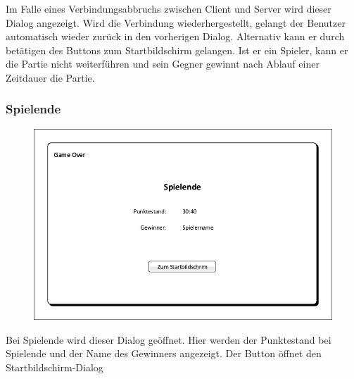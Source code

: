 Im Falle eines Verbindungsabbruchs zwischen Client und Server wird dieser Dialog angezeigt. Wird die Verbindung wiederhergestellt, gelangt der Benutzer automatisch wieder zurück in den vorherigen Dialog. Alternativ kann er durch betätigen des Buttons zum Startbildschirm gelangen. Ist er ein Spieler, kann er die Partie nicht weiterführen und sein Gegner gewinnt nach Ablauf einer Zeitdauer die Partie.

\subsubsection{Spielende}
\begin{figure}[H]
	\centering
	\includegraphics[scale=0.8]{images/Spielende.pdf}
\end{figure}

Bei Spielende wird dieser Dialog geöffnet. Hier werden der Punktestand bei Spielende und der Name des Gewinners angezeigt. Der Button öffnet den Startbildschirm-Dialog